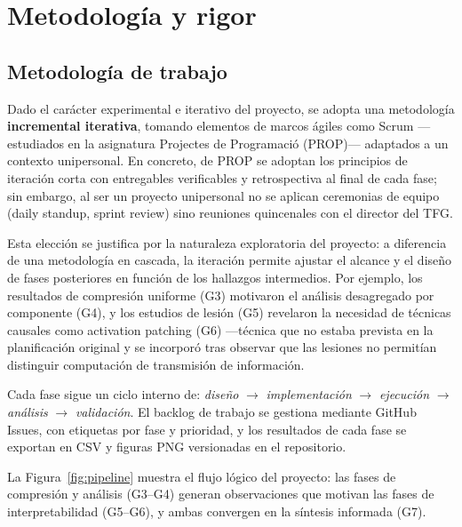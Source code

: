 \documentclass[11pt, a4paper]{article}
\begin{document}
\section{Metodología y rigor}
\label{sec:metodologia}

\subsection{Metodología de trabajo}

Dado el carácter experimental e iterativo del proyecto, se adopta una metodología \textbf{incremental iterativa}, tomando elementos de marcos ágiles como Scrum ---estudiados en la asignatura Projectes de Programació (PROP)--- adaptados a un contexto unipersonal. En concreto, de PROP se adoptan los principios de iteración corta con entregables verificables y retrospectiva al final de cada fase; sin embargo, al ser un proyecto unipersonal no se aplican ceremonias de equipo (daily standup, sprint review) sino reuniones quincenales con el director del TFG.

Esta elección se justifica por la naturaleza exploratoria del proyecto: a diferencia de una metodología en cascada, la iteración permite ajustar el alcance y el diseño de fases posteriores en función de los hallazgos intermedios. Por ejemplo, los resultados de compresión uniforme (G3) motivaron el análisis desagregado por componente (G4), y los estudios de lesión (G5) revelaron la necesidad de técnicas causales como activation patching (G6) ---técnica que no estaba prevista en la planificación original y se incorporó tras observar que las lesiones no permitían distinguir computación de transmisión de información.

Cada fase sigue un ciclo interno de: \textit{diseño} $\rightarrow$ \textit{implementación} $\rightarrow$ \textit{ejecución} $\rightarrow$ \textit{análisis} $\rightarrow$ \textit{validación}. El backlog de trabajo se gestiona mediante GitHub Issues, con etiquetas por fase y prioridad, y los resultados de cada fase se exportan en CSV y figuras PNG versionadas en el repositorio.

La Figura~\ref{fig:pipeline} muestra el flujo lógico del proyecto: las fases de compresión y análisis (G3--G4) generan observaciones que motivan las fases de interpretabilidad (G5--G6), y ambas convergen en la síntesis informada (G7).
\end{document}
